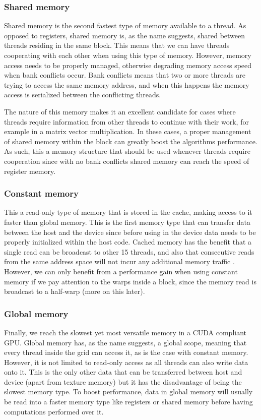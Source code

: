 \documentclass[12pt, openany]{book}
\begin{document}
\subsubsection{Shared memory} 
Shared memory is the second fastest type of memory available to a thread. As opposed to registers, shared memory is, as the name suggests, shared between threads residing in the same block. This means that we can have threads cooperating with each other when using this type of memory. However, memory access needs to be properly managed, otherwise degrading memory access speed when bank conflicts occur. Bank conflicts means that two or more threads are trying to access the same memory address, and when this happens the memory access is serialized between the conflicting threads.\par
The nature of this memory makes it an excellent candidate for cases where threads require information from other threads to continue with their work, for example in a matrix vector multiplication. In these cases, a proper management of shared memory within the block can greatly boost the algorithms performance. As such, this a memory structure that should be used whenever threads require cooperation since with no bank conflicts shared memory can reach the speed of register memory.
\subsubsection{Constant memory}
This a read-only type of memory that is stored in the cache, making access to it faster than global memory. This is the first memory type that can transfer data between the host and the device since before using in the device data needs to be properly initialized within the host code. Cached memory has the benefit that a single read can be broadcast to other 15 threads, and also that consecutive reads from the same address space will not incur any additional memory traffic \cite{cuda_by_example}. However, we can only benefit from a performance gain when using constant memory if we pay attention to the warps inside a block, since the memory read is broadcast to a half-warp (more on this later).
\subsubsection{Global memory}
Finally, we reach the slowest yet most versatile memory in a CUDA compliant GPU. Global memory has, as the name suggests, a global scope, meaning that every thread inside the grid can access it, as is the case with constant memory. However, it is not limited to read-only access as all threads can also write data onto it. This is the only other data that can be transferred between host and device (apart from texture memory) but it has the disadvantage of being the slowest memory type. To boost performance, data in global memory will usually be read into a faster memory type like registers or shared memory before having computations performed over it.
\end{document}
